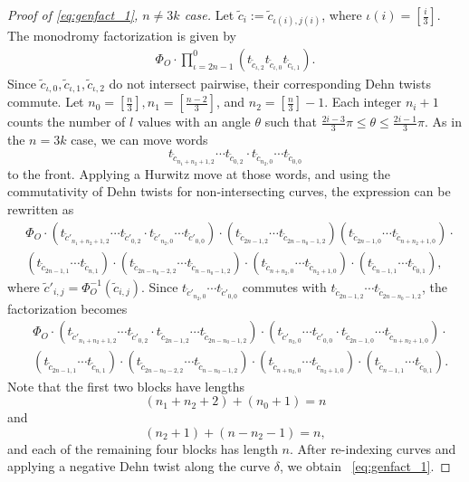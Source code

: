 \documentclass[10pt,a4paper,reqno]{amsart}
\theoremstyle{definition}
\numberwithin{equation}{section}
\numberwithin{figure}{section}
\begin{document}
\begin{proof}[Proof of \eqref{eq:genfact_1}, $n\neq 3k$ case]
Let $\tilde{c}_i:=\tilde{c}_{\iota(i), j(i)}$, where $\iota(i)=[\frac{i}{3}]$.
The monodromy factorization is given by
\begin{align}
\Phi_O \cdot \prod_{\iota=2n-1}^0 (t_{\tilde{c}_{\iota,2}}t_{\tilde{c}_{\iota,0}}t_{\tilde{c}_{\iota,1}}).
\end{align}
Since $\tilde{c}_{\iota,0},\tilde{c}_{\iota,1},\tilde{c}_{\iota,2}$ do not intersect pairwise, their corresponding Dehn twists commute.
Let $n_0=\left[\frac{n}{3}\right], n_1=\left[\frac{n-2}{3}\right]$, and $n_2=\left[\frac{n}{3}\right]-1$.
Each integer $n_i+1$ counts the number of $l$ values with an angle $\theta$ such that $\frac{2i-3}{3} \pi \le \theta \le \frac{2i-1}{3} \pi$.
As in the $n=3k$ case, we can move words 
\[t_{\tilde{c}_{n_1+n_2+1,2}} \cdots t_{\tilde{c}_{0,2}} \cdot t_{\tilde{c}_{n_2,0}} \cdots t_{\tilde{c}_{0,0}}\]
to the front. Applying a Hurwitz move at those words, and using the commutativity of Dehn twists for non-intersecting curves, the expression can be rewritten as
\begin{align*}
&\Phi_O\cdot 
(t_{\tilde{c}'_{n_1+n_2+1,2}} \cdots t_{\tilde{c}'_{0,2}} \cdot 
t_{\tilde{c}'_{n_2,0}} \cdots t_{\tilde{c}'_{0,0}})\cdot 
(t_{\tilde{c}_{2n-1,2}}\cdots t_{\tilde{c}_{2n-n_0-1,2}})
(t_{\tilde{c}_{2n-1,0}}\cdots t_{\tilde{c}_{n+n_2+1,0}})\cdot \\
&(t_{\tilde{c}_{2n-1,1}}\cdots t_{\tilde{c}_{n,1}}) \cdot 
(t_{\tilde{c}_{2n-n_0-2,2}}\cdots t_{\tilde{c}_{n-n_0-1,2}})\cdot 
(t_{\tilde{c}_{n+n_2,0}}\cdots t_{\tilde{c}_{n_2+1,0}})\cdot (t_{\tilde{c}_{n-1,1}}\cdots t_{\tilde{c}_{0,1}}),
\end{align*}
where $\tilde{c}'_{i,j}=\Phi_O^{-1}(\tilde{c}_{i,j})$.
Since $t_{\tilde{c}'_{n_2,0}} \cdots t_{\tilde{c}'_{0,0}}$ commutes with $t_{\tilde{c}_{2n-1,2}} \cdots t_{\tilde{c}_{2n-n_0-1,2}}$, 
the factorization becomes
\begin{align*}
&\Phi_O\cdot 
(t_{\tilde{c}'_{n_1+n_2+1,2}} \cdots t_{\tilde{c}'_{0,2}} \cdot 
t_{\tilde{c}_{2n-1,2}}\cdots t_{\tilde{c}_{2n-n_0-1,2}})\cdot
(t_{\tilde{c}'_{n_2,0}} \cdots t_{\tilde{c}'_{0,0}}\cdot
t_{\tilde{c}_{2n-1,0}}\cdots t_{\tilde{c}_{n+n_2+1,0}})\cdot \\
&(t_{\tilde{c}_{2n-1,1}}\cdots t_{\tilde{c}_{n,1}}) \cdot 
(t_{\tilde{c}_{2n-n_0-2,2}}\cdots t_{\tilde{c}_{n-n_0-1,2}})\cdot 
(t_{\tilde{c}_{n+n_2,0}}\cdots t_{\tilde{c}_{n_2+1,0}})\cdot (t_{\tilde{c}_{n-1,1}}\cdots t_{\tilde{c}_{0,1}}).
\end{align*}
Note that the first two blocks have lengths
\[(n_1+n_2+2)+(n_0+1)=n\]
and
\[(n_2+1)+(n-n_2-1)=n,\]
and each of the remaining four blocks has length $n$.
After re-indexing curves and applying a negative Dehn twist along the curve $\delta$, we obtain ~\eqref{eq:genfact_1}.
\end{proof}
\end{document}
